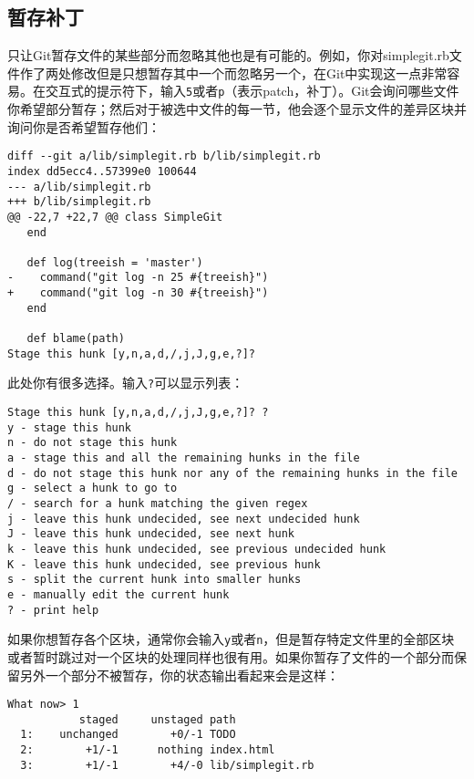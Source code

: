 \documentclass[a4paper]{book}
\begin{document}
\subsection{暂存补丁}

只让Git暂存文件的某些部分而忽略其他也是有可能的。例如，你对simplegit.rb文件作了两处修改但是只想暂存其中一个而忽略另一个，在Git中实现这一点非常容易。在交互式的提示符下，输入\texttt{5}或者\texttt{p}（表示patch，补丁）。Git会询问哪些文件你希望部分暂存；然后对于被选中文件的每一节，他会逐个显示文件的差异区块并询问你是否希望暂存他们：

\begin{shaded}\begin{verbatim}
diff --git a/lib/simplegit.rb b/lib/simplegit.rb
index dd5ecc4..57399e0 100644
--- a/lib/simplegit.rb
+++ b/lib/simplegit.rb
@@ -22,7 +22,7 @@ class SimpleGit
   end

   def log(treeish = 'master')
-    command("git log -n 25 #{treeish}")
+    command("git log -n 30 #{treeish}")
   end

   def blame(path)
Stage this hunk [y,n,a,d,/,j,J,g,e,?]? 
\end{verbatim}\end{shaded}

此处你有很多选择。输入\texttt{?}可以显示列表：

\begin{shaded}\begin{verbatim}
Stage this hunk [y,n,a,d,/,j,J,g,e,?]? ?
y - stage this hunk
n - do not stage this hunk
a - stage this and all the remaining hunks in the file
d - do not stage this hunk nor any of the remaining hunks in the file
g - select a hunk to go to
/ - search for a hunk matching the given regex
j - leave this hunk undecided, see next undecided hunk
J - leave this hunk undecided, see next hunk
k - leave this hunk undecided, see previous undecided hunk
K - leave this hunk undecided, see previous hunk
s - split the current hunk into smaller hunks
e - manually edit the current hunk
? - print help
\end{verbatim}\end{shaded}

如果你想暂存各个区块，通常你会输入\texttt{y}或者\texttt{n}，但是暂存特定文件里的全部区块或者暂时跳过对一个区块的处理同样也很有用。如果你暂存了文件的一个部分而保留另外一个部分不被暂存，你的状态输出看起来会是这样：

\begin{shaded}\begin{verbatim}
What now> 1
           staged     unstaged path
  1:    unchanged        +0/-1 TODO
  2:        +1/-1      nothing index.html
  3:        +1/-1        +4/-0 lib/simplegit.rb
\end{verbatim}\end{shaded}
\end{document}
